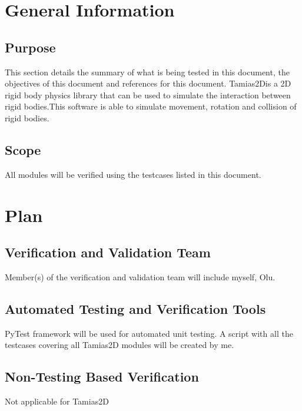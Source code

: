 \documentclass[12pt, titlepage]{article}
\newcommand{\progname}{Tamias2D}
\begin{document}

\section{General Information}
\subsection{Purpose}

This section details the summary of what is being tested in this document, the objectives of this document and references for this document. \progname is a 2D rigid body physics library that can be used to simulate the interaction between rigid bodies.This software is able to simulate movement, rotation and collision of rigid bodies.

\subsection{Scope}
All modules will be verified using the testcases listed in this document.

\section{Plan}
	
\subsection{Verification and Validation Team}

Member(s) of the verification and validation team will include myself, Olu.

\subsection{Automated Testing and Verification Tools}
PyTest framework will be used for automated unit
testing. A script with all the testcases covering all \progname{} modules  will be created by me. 


\subsection{Non-Testing Based Verification}
Not applicable for \progname

\end{document}

